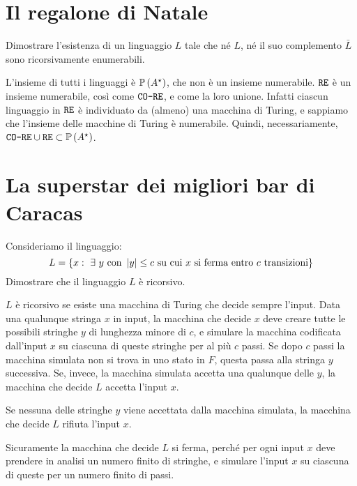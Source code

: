 \section{Il regalone di Natale}

\begin{esercizio}
Dimostrare l'esistenza di un linguaggio $L$ tale che n\'e $L$, n\'e il suo complemento $\bar{L}$ sono ricorsivamente enumerabili. 
\end{esercizio}

L'insieme di tutti i linguaggi \`e $\mathbb{P} \left( A^{\star} \right)$, che non \`e un insieme numerabile. $\texttt{RE}$ \`e un insieme numerabile, cos\`i come $\texttt{CO-RE}$, e come la loro unione. Infatti ciascun linguaggio in $\texttt{RE}$ \`e individuato da (almeno) una macchina di Turing, e sappiamo che l'insieme delle macchine di Turing \`e numerabile. Quindi, necessariamente, $\texttt{CO-RE} \cup \texttt{RE} \subset \mathbb{P} \left( A^{\star} \right)$.

\section{La superstar dei migliori bar di Caracas}

\begin{esercizio}
Consideriamo il linguaggio:
\[
L = \{ x : \exists y \text{ con } \abs{y} \le c \text{ su cui } x \text{ si ferma entro } c \text{ transizioni} \}
\]
Dimostrare che il linguaggio $L$ \`e ricorsivo.
\end{esercizio}

$L$ \`e ricorsivo se esiste una macchina di Turing che decide sempre l'input. Data una qualunque stringa $x$ in input, la macchina che decide $x$ deve creare tutte le possibili stringhe $y$ di lunghezza minore di $c$, e simulare la macchina codificata dall'input $x$ su ciascuna di queste stringhe per al pi\`u $c$ passi. Se dopo $c$ passi la macchina simulata non si trova in uno stato in $F$, questa passa alla stringa $y$ successiva. Se, invece, la macchina simulata accetta una qualunque delle $y$, la macchina che decide $L$ accetta l'input $x$.

Se nessuna delle stringhe $y$ viene accettata dalla macchina simulata, la macchina che decide $L$ rifiuta l'input $x$.

Sicuramente la macchina che decide $L$ si ferma, perch\'e per ogni input $x$ deve prendere in analisi un numero finito di stringhe, e simulare l'input $x$ su ciascuna di queste per un numero finito di passi.


















































